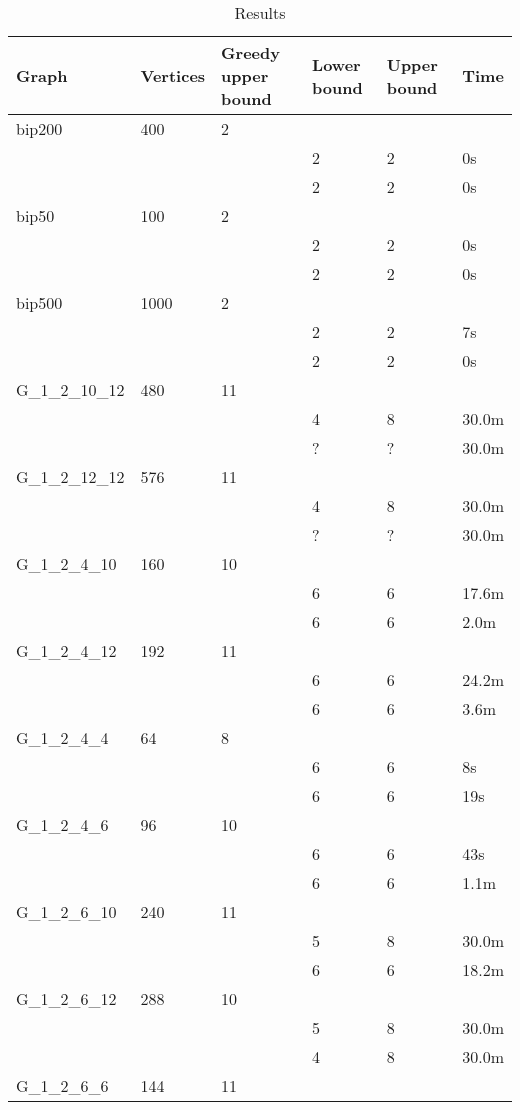 \begin{table}[]
\centering
\caption{Results}
\label{table}
\begin{tabular}{|lll|l|l|l|}
Graph & Vertices &Greedy upper bound&Lower bound &Upper bound&Time\\
\toprule
bip200&400&2&&&\\
&&&2  &2 &0s\\
\cline{4-6}
&&&2  &2 &0s\\
\cline{4-6}
\hline
bip50&100&2&&&\\
&&&2  &2 &0s\\
\cline{4-6}
&&&2  &2 &0s\\
\cline{4-6}
\hline
bip500&1000&2&&&\\
&&&2  &2 &7s\\
\cline{4-6}
&&&2  &2 &0s\\
\cline{4-6}
\hline
G\_1\_2\_10\_12&480&11&&&\\
&&&4  &8 &30.0m\\
\cline{4-6}
&&&?  &? &30.0m\\
\cline{4-6}
\hline
G\_1\_2\_12\_12&576&11&&&\\
&&&4  &8 &30.0m\\
\cline{4-6}
&&&?  &? &30.0m\\
\cline{4-6}
\hline
G\_1\_2\_4\_10&160&10&&&\\
&&&6  &6 &17.6m\\
\cline{4-6}
&&&6  &6 &2.0m\\
\cline{4-6}
\hline
G\_1\_2\_4\_12&192&11&&&\\
&&&6  &6 &24.2m\\
\cline{4-6}
&&&6  &6 &3.6m\\
\cline{4-6}
\hline
G\_1\_2\_4\_4&64&8&&&\\
&&&6  &6 &8s\\
\cline{4-6}
&&&6  &6 &19s\\
\cline{4-6}
\hline
G\_1\_2\_4\_6&96&10&&&\\
&&&6  &6 &43s\\
\cline{4-6}
&&&6  &6 &1.1m\\
\cline{4-6}
\hline
G\_1\_2\_6\_10&240&11&&&\\
&&&5  &8 &30.0m\\
\cline{4-6}
&&&6  &6 &18.2m\\
\cline{4-6}
\hline
G\_1\_2\_6\_12&288&10&&&\\
&&&5  &8 &30.0m\\
\cline{4-6}
&&&4  &8 &30.0m\\
\cline{4-6}
\hline
G\_1\_2\_6\_6&144&11&&&\\

\end{tabular}
\end{table}
